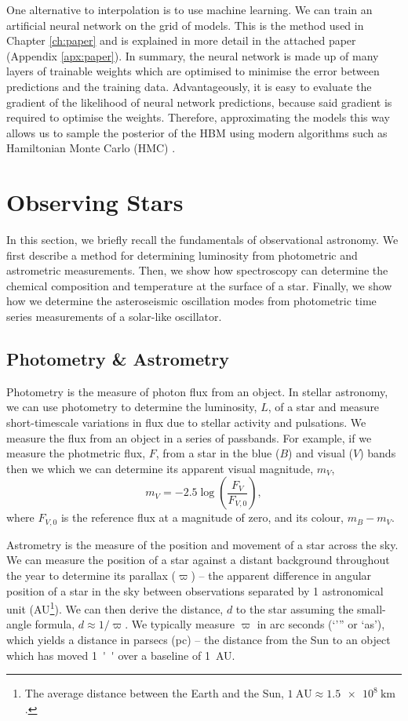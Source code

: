 One alternative to interpolation is to use machine learning. We can train an artificial neural network on the grid of models. This is the method used in Chapter \ref{ch:paper} and is explained in more detail in the attached paper (Appendix \ref{apx:paper}). In summary, the neural network is made up of many layers of trainable weights which are optimised to minimise the error between predictions and the training data. Advantageously, it is easy to evaluate the gradient of the likelihood of neural network predictions, because said gradient is required to optimise the weights. Therefore, approximating the models this way allows us to sample the posterior of the HBM using modern algorithms such as Hamiltonian Monte Carlo (HMC) \citep[see e.g. the No-U-Turn Sampler][]{Homan.Gelman2014}.

\section{Observing Stars}

In this section, we briefly recall the fundamentals of observational astronomy. We first describe a method for determining luminosity from photometric and astrometric measurements. Then, we show how spectroscopy can determine the chemical composition and temperature at the surface of a star. Finally, we show how we determine the asteroseismic oscillation modes from photometric time series measurements of a solar-like oscillator.

\subsection{Photometry \& Astrometry}

Photometry is the measure of photon flux from an object. In stellar astronomy, we can use photometry to determine the luminosity, $L$, of a star and measure short-timescale variations in flux due to stellar activity and pulsations. We measure the flux from an object in a series of passbands. For example, if we measure the photmetric flux, $F$, from a star in the blue ($B$) and visual ($V$) bands then we which we can determine its apparent visual magnitude, $m_V$,
\begin{equation}
    m_V = - 2.5 \log(\frac{F_V}{F_{V,0}}),
\end{equation}
where $F_{V,0}$ is the reference flux at a magnitude of zero, and its colour, $m_B - m_V$.

Astrometry is the measure of the position and movement of a star across the sky. We can measure the position of a star against a distant background throughout the year to determine its parallax ($\varpi$) -- the apparent difference in angular position of a star in the sky between observations separated by 1 astronomical unit (AU\footnote{The average distance between the Earth and the Sun, $\SI{1}{\mathrm{AU}} \approx \SI{1.5e8}{\kilo\meter}$.}). We can then derive the distance, $d$ to the star assuming the small-angle formula, $d \approx 1/\varpi$. We typically measure $\varpi$ in arc seconds (`''' or `as'), which yields a distance in parsecs (pc) -- the distance from the Sun to an object which has moved \SI{1}{''} over a baseline of \SI{1}{AU}.

